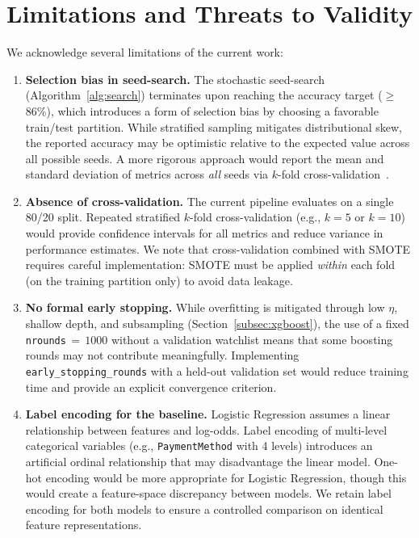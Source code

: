\documentclass[10pt, conference, letterpaper]{IEEEtran}
\begin{document}
\section{Limitations and Threats to Validity}
\label{sec:limitations}

We acknowledge several limitations of the current work:

\begin{enumerate}
    \item \textbf{Selection bias in seed-search.} The stochastic seed-search (Algorithm~\ref{alg:search}) terminates upon reaching the accuracy target ($\geq$86\%), which introduces a form of selection bias by choosing a favorable train/test partition. While stratified sampling mitigates distributional skew, the reported accuracy may be optimistic relative to the expected value across all possible seeds. A more rigorous approach would report the mean and standard deviation of metrics across \textit{all} seeds via $k$-fold cross-validation~\cite{kuhn2008caret}.

    \item \textbf{Absence of cross-validation.} The current pipeline evaluates on a single 80/20 split. Repeated stratified $k$-fold cross-validation (e.g., $k{=}5$ or $k{=}10$) would provide confidence intervals for all metrics and reduce variance in performance estimates. We note that cross-validation combined with SMOTE requires careful implementation: SMOTE must be applied \textit{within} each fold (on the training partition only) to avoid data leakage.

    \item \textbf{No formal early stopping.} While overfitting is mitigated through low $\eta$, shallow depth, and subsampling (Section~\ref{subsec:xgboost}), the use of a fixed \texttt{nrounds}$\,{=}\,1000$ without a validation watchlist means that some boosting rounds may not contribute meaningfully. Implementing \texttt{early\_stopping\_rounds} with a held-out validation set would reduce training time and provide an explicit convergence criterion.

    \item \textbf{Label encoding for the baseline.} Logistic Regression assumes a linear relationship between features and log-odds. Label encoding of multi-level categorical variables (e.g., \texttt{PaymentMethod} with 4 levels) introduces an artificial ordinal relationship that may disadvantage the linear model. One-hot encoding would be more appropriate for Logistic Regression, though this would create a feature-space discrepancy between models. We retain label encoding for both models to ensure a controlled comparison on identical feature representations.


\end{enumerate}
\end{document}
